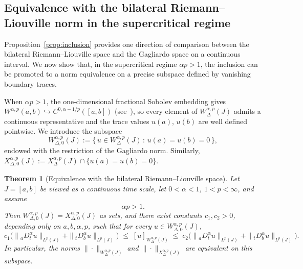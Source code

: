 \documentclass[11pt,a4paper]{article}
\numberwithin{equation}{section}
\newtheorem{theorem}{Theorem}[section]
\theoremstyle{definition}
\begin{document}
\subsection{Equivalence with the bilateral Riemann--Liouville norm in the supercritical regime}\label{subsec:RL-equivalence-supercritical}

Proposition~\ref{prop:inclusion} provides one direction of comparison
between the bilateral Riemann--Liouville space and the Gagliardo space
on a continuous interval. We now show that, in the supercritical regime
$\alpha p > 1$, the inclusion can be promoted to a norm equivalence
on a precise subspace defined by vanishing boundary traces.

When $\alpha p > 1$, the one-dimensional fractional Sobolev embedding
gives $W^{\alpha,p}(a,b) \hookrightarrow C^{0,\alpha-1/p}([a,b])$
(see~\cite[Theorem~8.2]{DiNezzaPalatucciValdinoci2012}), so every
element of $W^{\alpha,p}_\Delta(J)$ admits a continuous representative
and the trace values $u(a)$, $u(b)$ are well defined pointwise. We
introduce the subspace
\begin{equation}\label{eq:W0-def}
W^{\alpha,p}_{\Delta,0}(J)
:= \bigl\{\, u \in W^{\alpha,p}_\Delta(J) \,:\, u(a) = u(b) = 0 \,\bigr\},
\end{equation}
endowed with the restriction of the Gagliardo norm. Similarly,
$X^{\alpha,p}_{\Delta,0}(J) := X^{\alpha,p}_\Delta(J) \cap
\bigl\{ u(a) = u(b) = 0 \bigr\}$.

\begin{theorem}[Equivalence with the bilateral Riemann--Liouville space]\label{thm:RL-equivalence}
Let $J = [a,b]$ be viewed as a continuous time scale, let $0 < \alpha < 1$,
$1 < p < \infty$, and assume
\[
  \alpha p > 1.
\]
Then $W^{\alpha,p}_{\Delta,0}(J) = X^{\alpha,p}_{\Delta,0}(J)$ as sets,
and there exist constants $c_1, c_2 > 0$, depending only on
$a, b, \alpha, p$, such that for every $u \in W^{\alpha,p}_{\Delta,0}(J)$,
\begin{equation}\label{eq:RL-norm-equivalence}
c_1 \bigl( \|{}_a D^\alpha_t u\|_{L^p(J)} + \|{}_t D^\alpha_b u\|_{L^p(J)} \bigr)
\;\le\; [u]_{W^{\alpha,p}_\Delta(J)}
\;\le\; c_2 \bigl( \|{}_a D^\alpha_t u\|_{L^p(J)} + \|{}_t D^\alpha_b u\|_{L^p(J)} \bigr).
\end{equation}
In particular, the norms $\|\cdot\|_{W^{\alpha,p}_\Delta(J)}$ and
$\|\cdot\|_{X^{\alpha,p}_\Delta(J)}$ are equivalent on this subspace.
\end{theorem}
\end{document}
